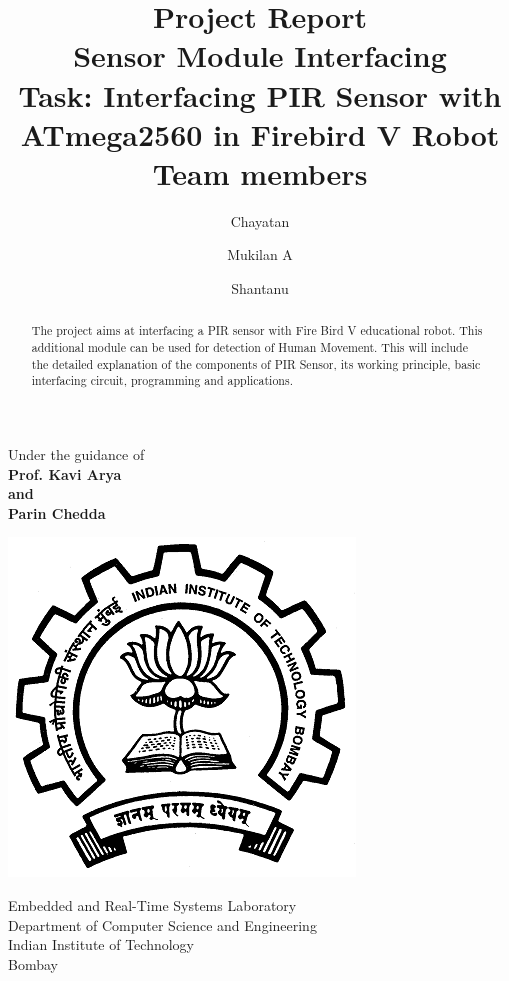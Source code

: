 \documentclass[a4paper,12 pt]{article}
\title {Project Report \\ Sensor Module Interfacing \\[10pt] Task:
Interfacing PIR Sensor with ATmega2560 in Firebird V Robot \\[25pt] Team members }
\author {Chayatan \and Mukilan A \and Shantanu}
\begin{document}
\maketitle
\begin{center}
\begin{large}
Under the guidance of\\
\textbf{Prof. Kavi Arya\\and\\Parin Chedda}\\
\vspace{0.5in}
\end{large}
\end{center}
\begin{center}
\includegraphics[scale=0.32]{iitb.png}
\end{center}
\begin{center}
\begin{large}
Embedded and Real-Time Systems Laboratory \\
Department of Computer Science and Engineering \\
Indian Institute of Technology \\
Bombay \\
\end{large}
\end{center}

\newpage
\tableofcontents
\newpage

\begin{abstract}
The project aims at interfacing a PIR sensor with Fire Bird
V educational robot. This additional module can be used for detection
of Human Movement. This will
include the detailed explanation of the components of PIR Sensor, its working principle, basic interfacing circuit, programming and
applications.
\end{abstract}
\end{document}
